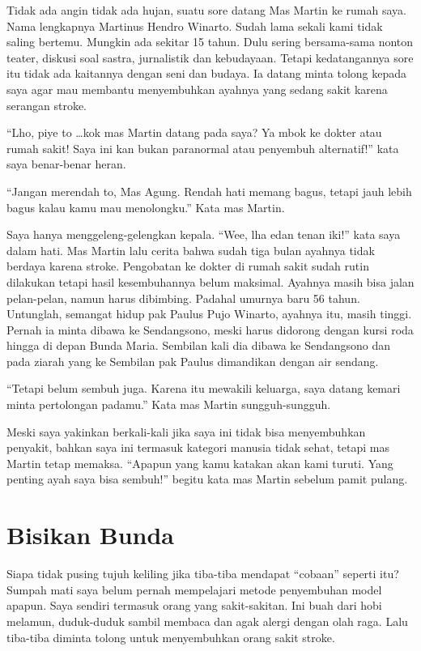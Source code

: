 \small

	Tidak ada angin tidak ada hujan, suatu sore datang Mas Martin ke rumah saya. Nama lengkapnya Martinus Hendro Winarto. Sudah lama sekali kami tidak saling bertemu. Mungkin ada sekitar 15 tahun. Dulu sering bersama-sama nonton teater, diskusi soal sastra, jurnalistik dan kebudayaan. Tetapi kedatangannya sore itu tidak ada kaitannya dengan seni dan budaya. Ia datang minta tolong kepada saya agar mau membantu menyembuhkan ayahnya yang sedang sakit karena serangan stroke.

	“Lho, piye to \ldots kok mas Martin datang pada saya? Ya mbok ke dokter atau rumah sakit! Saya ini kan bukan paranormal atau penyembuh alternatif!” kata saya benar-benar heran.

	“Jangan merendah to, Mas Agung. Rendah hati memang bagus, tetapi jauh lebih bagus kalau kamu mau menolongku.” Kata mas Martin.

	Saya hanya menggeleng-gelengkan kepala. “Wee, lha edan tenan iki!” kata saya dalam hati. Mas Martin lalu cerita bahwa sudah tiga bulan ayahnya tidak berdaya karena stroke. Pengobatan ke dokter di rumah sakit sudah rutin dilakukan tetapi hasil kesembuhannya belum maksimal. Ayahnya masih bisa jalan pelan-pelan, namun harus dibimbing. Padahal umurnya baru 56 tahun. Untunglah, semangat hidup pak Paulus Pujo Winarto, ayahnya itu, masih tinggi. Pernah ia minta dibawa ke Sendangsono, meski harus didorong dengan kursi roda hingga di depan Bunda Maria. Sembilan kali dia dibawa ke Sendangsono dan pada ziarah yang ke Sembilan pak Paulus dimandikan dengan air sendang.

	“Tetapi belum sembuh juga. Karena itu mewakili keluarga, saya datang kemari minta pertolongan padamu.” Kata mas Martin sungguh-sungguh.

	Meski saya yakinkan berkali-kali jika saya ini tidak bisa menyembuhkan penyakit, bahkan saya ini termasuk kategori manusia tidak sehat, tetapi mas Martin tetap memaksa. “Apapun yang kamu katakan akan kami turuti. Yang penting ayah saya bisa sembuh!” begitu kata mas Martin sebelum pamit pulang. 

\section*{Bisikan Bunda}

	Siapa tidak pusing tujuh keliling jika tiba-tiba mendapat “cobaan” seperti itu? Sumpah mati saya belum pernah mempelajari metode penyembuhan model apapun. Saya sendiri termasuk orang yang sakit-sakitan. Ini buah dari hobi melamun, duduk-duduk sambil membaca dan agak alergi dengan olah raga. Lalu tiba-tiba diminta tolong untuk menyembuhkan orang sakit stroke.

